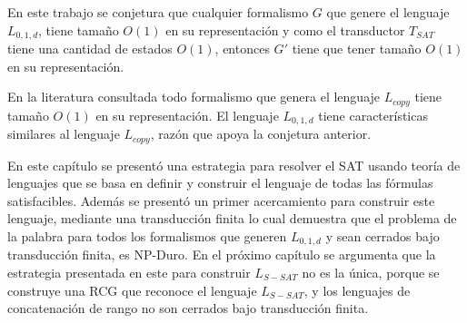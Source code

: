 \documentclass[12pt]{article}
\begin{document}
En este trabajo se conjetura que cualquier formalismo $G$ que genere el lenguaje $L_{0,1,d}$, tiene tamaño $O(1)$ en su representación y como el transductor $T_{SAT}$ tiene una cantidad de estados $O(1)$, entonces $G'$ tiene que tener tamaño $O(1)$ en su representación.

En la literatura consultada \cite{globalIndexLanguages,  propertiesRCGBib} todo formalismo que genera el lenguaje $L_{copy}$ tiene tamaño $O(1)$ en su representación. El lenguaje $L_{0,1,d}$ tiene características similares al lenguaje $L_{copy}$, razón que apoya la conjetura anterior.

En este capítulo se presentó una estrategia para resolver el SAT usando teoría de lenguajes que se basa en 
definir y construir el lenguaje de todas las fórmulas satisfacibles. Además se presentó un primer acercamiento 
para construir este lenguaje, mediante una transducción finita lo cual demuestra que el problema de la palabra 
para todos los formalismos que generen $L_{0,1,d}$ y sean cerrados bajo transducción finita, es NP-Duro.
En el próximo capítulo se argumenta que la estrategia presentada en este para construir $L_{S-SAT}$ no es la única,
porque se construye una RCG que reconoce el lenguaje $L_{S-SAT}$, y los lenguajes de concatenación de rango 
no son cerrados bajo transducción finita. 
\end{document}
